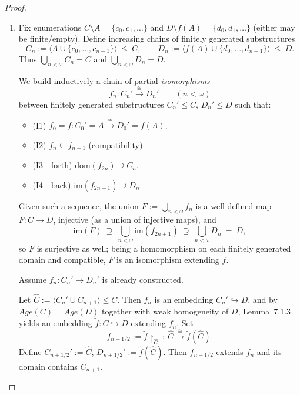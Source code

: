 \begin{proof}
    \leavevmode
    \begin{enumerate}[a]
        \item
              Fix enumerations $C\setminus A=\{c_0,c_1,\dots\}$ and $D\setminus f(A)=\{d_0,d_1,\dots\}$ (either may be finite/empty).
              Define increasing chains of finitely generated substructures
              \[
                  C_n:=\langle A\cup\{c_0,\dots,c_{n-1}\}\rangle\ \le\ C,\qquad
                  D_n:=\langle f(A)\cup\{d_0,\dots,d_{n-1}\}\rangle\ \le\ D.
              \]
              Thus $\bigcup_{n<\omega}C_n=C$ and $\bigcup_{n<\omega}D_n=D$.

              We build inductively a chain of partial \emph{isomorphisms}
              \[
                  f_n\colon C_n'\xrightarrow{\ \cong\ } D_n'\qquad(n<\omega)
              \]
              between finitely generated substructures $C_n'\le C$, $D_n'\le D$ such that:

              \begin{itemize}
                  \item(I1) $f_0=f\colon C_0'=A \xrightarrow{\ \cong\ } D_0'=f(A)$.
                  \item(I2) $f_n\subseteq f_{n+1}$ (compatibility).
                  \item(I3 - forth) $\text{dom}(f_{2n})\supseteq C_n$.
                  \item(I4 - back) $\text{im}(f_{2n+1})\supseteq D_n$.
              \end{itemize}

              Given such a sequence, the union $F:=\bigcup_{n<\omega}f_n$ is a well-defined
              map $F\colon C\to D$, injective (as a union of injective maps), and
              \[
                  \text{im}(F)\ \supseteq\ \bigcup_{n<\omega}\text{im}(f_{2n+1})\ \supseteq\ \bigcup_{n<\omega}D_n\ =\ D,
              \]
              so $F$ is surjective as well; being a homomorphism on each finitely generated
              domain and compatible, $F$ is an isomorphism extending $f$.


              Assume $f_n\colon C_n'\to D_n'$ is already constructed.

              Let $\widehat C:=\langle C_n'\cup C_{n+1}\rangle\le C$.
              Then $f_n$ is an embedding $C_n'\hookrightarrow D$, and by $Age(C)=Age(D)$
              together with weak homogeneity of $D$, Lemma~7.1.3 yields an embedding
              $\widetilde f\colon C\hookrightarrow D$ extending $f_n$. Set
              \[
                  f_{n+1/2}:=\widetilde f\!\upharpoonright_{\widehat C}\ \colon\
                  \widehat C \xrightarrow{\ \cong\ } \widetilde f(\widehat C).
              \]
              Define $C_{n+1/2}':=\widehat C$, $D_{n+1/2}':=\widetilde f(\widehat C)$.
              Then $f_{n+1/2}$ extends $f_n$ and its domain contains $C_{n+1}$.


\end{enumerate}
\end{proof}
